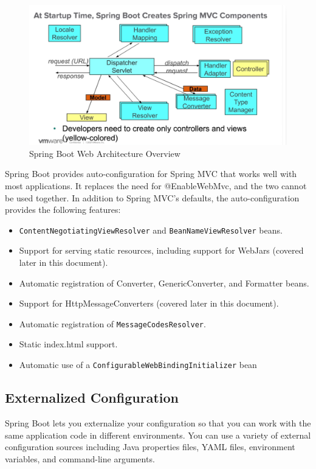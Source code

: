 \documentclass{scrartcl}
\begin{document}
\begin{figure}[h]
    \centering
    \includegraphics[width=1\linewidth]{spring-web}
    \caption{Spring Boot Web Architecture Overview}
    \label{fig:spring-web}
\end{figure}

Spring Boot provides auto-configuration for Spring MVC that works well with most applications. It replaces the need for @EnableWebMvc, and the two cannot be used together. In addition to Spring MVC’s defaults, the auto-configuration provides the following features:

\begin{itemize}
    \item \lstinline|ContentNegotiatingViewResolver| and \lstinline|BeanNameViewResolver| beans.
    \item Support for serving static resources, including support for WebJars (covered later in this document).
    \item Automatic registration of Converter, GenericConverter, and Formatter beans.
    \item Support for HttpMessageConverters (covered later in this document).
    \item Automatic registration of \lstinline|MessageCodesResolver|.
    \item Static index.html support.
    \item Automatic use of a \lstinline|ConfigurableWebBindingInitializer| bean
\end{itemize}

\subsection{Externalized Configuration}

Spring Boot lets you externalize your configuration so that you can work with the same application code in different environments. You can use a variety of external configuration sources including Java properties files, YAML files, environment variables, and command-line arguments.
\end{document}
